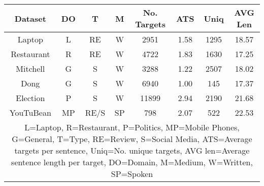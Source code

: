 \begin{tabular}{|c|c|c|c|c|c|c|c|}
\hline
Dataset & DO & T & M & No. Targets & ATS & Uniq & AVG Len \\
 \hline
Laptop & L & RE & W & 2951 & 1.58 & 1295 & 18.57  \\
\hline
Restaurant & R & RE & W & 4722 & 1.83 & 1630 & 17.25  \\
\hline
Mitchell & G & S & W & 3288 & 1.22 & 2507 & 18.02 \\
\hline
Dong & G & S & W & 6940 & 1.00 & 145 & 17.37 \\
\hline
Election & P & S & W & 11899 & 2.94 & 2190 & 21.68 \\
\hline
YouTuBean & MP & RE\slash S & SP & 798 & 2.07 & 522 & 22.53 \\
\hline
\multicolumn{8}{|p{0.95\linewidth}|}{L=Laptop, R=Restaurant, P=Politics, MP=Mobile Phones, G=General, T=Type, RE=Review, S=Social Media, ATS=Average targets per sentence, Uniq=No. unique targets, AVG len=Average sentence length per target, DO=Domain, M=Medium, W=Written, SP=Spoken}\\
\hline
\end{tabular}